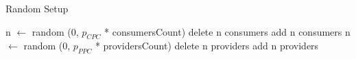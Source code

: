 \begin{algorithm}[H]
\caption{Random Setup}
\begin{algorithmic}
\STATE n $\leftarrow$ random (0, $p_{CPC}$ * consumersCount) 
\STATE delete n consumers
\STATE add n consumers
\STATE n $\leftarrow$ random (0, $p_{PPC}$ * providersCount) 
\STATE delete n providers
\STATE add n providers
\end{algorithmic}

\end{algorithm}